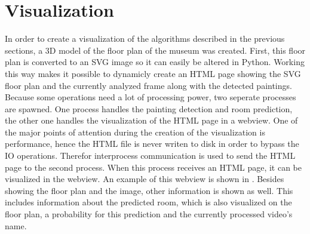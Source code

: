 \section{Visualization}

In order to create a visualization of the algorithms described in the previous sections, a 3D model of the floor plan of the museum was created. First, this floor plan is converted to an SVG image so it can easily be altered in Python. Working this way makes it possible to dynamicly create an HTML page showing the SVG floor plan and the currently analyzed frame along with the detected paintings. Because some operations need a lot of processing power, two seperate processes are spawned. One process handles the painting detection and room prediction, the other one handles the visualization of the HTML page in a webview. One of the major points of attention during the creation of the visualization is performance, hence the HTML file is never writen to disk in order to bypass the IO operations. Therefor interprocess communication is used to send the HTML page to the second process. When this process receives an HTML page, it can be visualized in the webview. An example of this webview is shown in . Besides showing the floor plan and the image, other information is shown as well. This includes information about the predicted room, which is also visualized on the floor plan, a probability for this prediction and the currently processed video's name.

